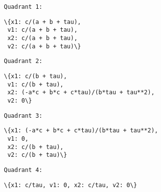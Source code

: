 \documentclass[11pt]{article}
\begin{document}
    \begin{Verbatim}[commandchars=\\\{\}]
Quadrant 1:
    \end{Verbatim}

    
    \begin{Verbatim}[commandchars=\\\{\}]
\{x1: c/(a + b + tau),
 v1: c/(a + b + tau),
 x2: c/(a + b + tau),
 v2: c/(a + b + tau)\}
    \end{Verbatim}

    
    \begin{Verbatim}[commandchars=\\\{\}]
Quadrant 2:
    \end{Verbatim}

    
    \begin{Verbatim}[commandchars=\\\{\}]
\{x1: c/(b + tau),
 v1: c/(b + tau),
 x2: (-a*c + b*c + c*tau)/(b*tau + tau**2),
 v2: 0\}
    \end{Verbatim}

    
    \begin{Verbatim}[commandchars=\\\{\}]
Quadrant 3:
    \end{Verbatim}

    
    \begin{Verbatim}[commandchars=\\\{\}]
\{x1: (-a*c + b*c + c*tau)/(b*tau + tau**2),
 v1: 0,
 x2: c/(b + tau),
 v2: c/(b + tau)\}
    \end{Verbatim}

    
    \begin{Verbatim}[commandchars=\\\{\}]
Quadrant 4:
    \end{Verbatim}

    
    \begin{Verbatim}[commandchars=\\\{\}]
\{x1: c/tau, v1: 0, x2: c/tau, v2: 0\}
    \end{Verbatim}
\end{document}
